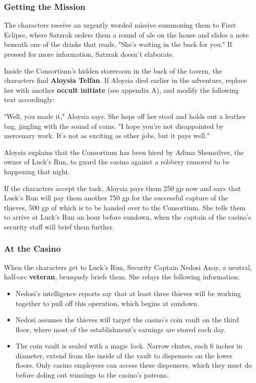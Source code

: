 \documentclass[10pt,a4paper,twoside,bg=print,twocolumn,openany,nodeprecatedcode]{dndbook}
\begin{document}
\subsubsection{Getting the Mission}
The characters receive an urgently worded missive summoning them to First Eclipse, where Satzrak orders them a round of ale on the house and slides a note beneath one of the drinks that reads, "She's waiting in the back for you." If pressed for more information, Satzrak doesn't elaborate.

Inside the Consortium's hidden storeroom in the back of the tavern, the characters find \textbf{Aloysia Telfan}. If Aloysia died earlier in the adventure, replace her with another \textbf{occult initiate} (see appendix A), and modify the following text accordingly:

\begin{DndReadAloud}{}
"Well, you made it," Aloysia says. She hops off her stool and holds out a leather bag, jingling with the sound of coins. "I hope you're not disappointed by mercenary work. It's not as exciting as other jobs, but it pays well."

\end{DndReadAloud}

Aloysia explains that the Consortium has been hired by Adima Shemsilver, the owner of Luck's Run, to guard the casino against a robbery rumored to be happening that night.

If the characters accept the task, Aloysia pays them 250 gp now and says that Luck's Run will pay them another 750 gp for the successful capture of the thieves, 500 gp of which is to be handed over to the Consortium. She tells them to arrive at Luck's Run an hour before sundown, when the captain of the casino's security staff will brief them further.

\subsubsection{At the Casino}
When the characters get to Luck's Run, Security Captain Nedosi Anay, a neutral, half-orc \textbf{veteran}, brusquely briefs them. She relays the following information:


\begin{itemize}
\item Nedosi's intelligence reports say that at least three thieves will be working together to pull off this operation, which begins at sundown.
\item Nedosi assumes the thieves will target the casino's coin vault on the third floor, where most of the establishment's earnings are stored each day.
\item The coin vault is sealed with a magic lock. Narrow chutes, each 6 inches in diameter, extend from the inside of the vault to dispensers on the lower floors. Only casino employees can access these dispensers, which they must do before doling out winnings to the casino's patrons.
\end{itemize}
\end{document}
